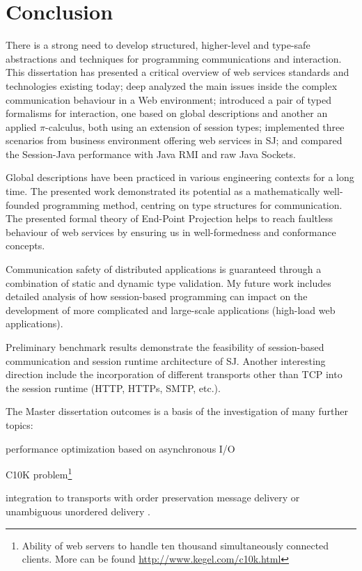 \chapter{Conclusion}
\label{chap:conclusion}

There is a strong need to develop structured, higher-level and type-safe abstractions and techniques for programming communications and interaction. This dissertation has presented a critical overview of web services standards and technologies existing today; deep analyzed the main issues inside the complex communication behaviour in a Web environment; introduced a pair of typed formalisms for interaction, one based on global descriptions and another an applied $\pi$-calculus, both using an extension of session types; implemented three scenarios from business environment offering web services in SJ; and compared the Session-Java performance with Java RMI and raw Java Sockets.

Global descriptions have been practiced in various engineering contexts for a long time. The presented work demonstrated its potential as a mathematically well-founded programming method, centring on type structures for communication. The presented formal theory of End-Point Projection helps to reach faultless behaviour of web services by ensuring us in well-formedness and conformance concepts.

Communication safety of distributed applications is guaranteed through a combination of static and dynamic type validation. My future work includes detailed analysis of how session-based programming can impact on the development of more complicated and large-scale applications (high-load web applications).

Preliminary benchmark results demonstrate the feasibility of session-based communication and session runtime architecture of SJ. Another interesting direction include the incorporation of different transports other than TCP into the session runtime (HTTP, HTTPs, SMTP, etc.).

The Master dissertation outcomes is a basis of the investigation of many further topics:

\begin{compactenum}
\item  performance optimization based on asynchronous I/O

\item  C10K problem\footnote{Ability of web servers to handle ten thousand simultaneously connected clients. More can be found \url{http://www.kegel.com/c10k.html}}

\item  integration to transports with order preservation message delivery \cite{dccp} or unambiguous unordered delivery \cite{amqp}.
\end{compactenum}